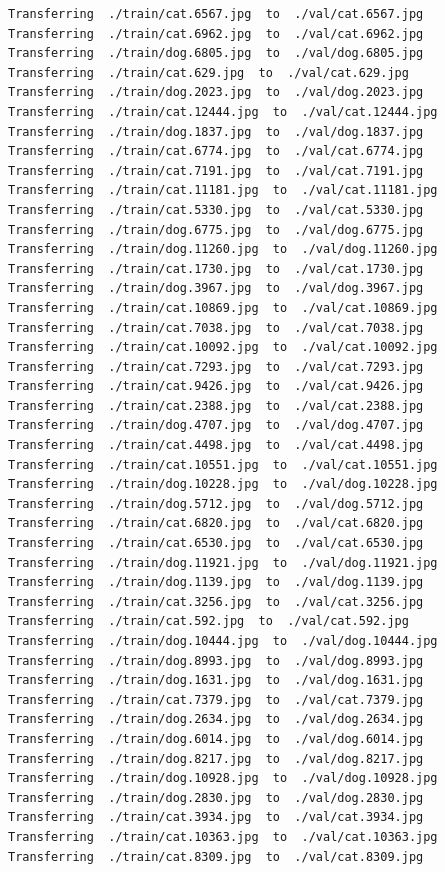 \documentclass[]{book}
\theoremstyle{definition}
\theoremstyle{definition}
\theoremstyle{definition}
\theoremstyle{remark}
\begin{document}
\begin{verbatim}
Transferring  ./train/cat.6567.jpg  to  ./val/cat.6567.jpg
Transferring  ./train/cat.6962.jpg  to  ./val/cat.6962.jpg
Transferring  ./train/dog.6805.jpg  to  ./val/dog.6805.jpg
Transferring  ./train/cat.629.jpg  to  ./val/cat.629.jpg
Transferring  ./train/dog.2023.jpg  to  ./val/dog.2023.jpg
Transferring  ./train/cat.12444.jpg  to  ./val/cat.12444.jpg
Transferring  ./train/dog.1837.jpg  to  ./val/dog.1837.jpg
Transferring  ./train/cat.6774.jpg  to  ./val/cat.6774.jpg
Transferring  ./train/cat.7191.jpg  to  ./val/cat.7191.jpg
Transferring  ./train/cat.11181.jpg  to  ./val/cat.11181.jpg
Transferring  ./train/cat.5330.jpg  to  ./val/cat.5330.jpg
Transferring  ./train/dog.6775.jpg  to  ./val/dog.6775.jpg
Transferring  ./train/dog.11260.jpg  to  ./val/dog.11260.jpg
Transferring  ./train/cat.1730.jpg  to  ./val/cat.1730.jpg
Transferring  ./train/dog.3967.jpg  to  ./val/dog.3967.jpg
Transferring  ./train/cat.10869.jpg  to  ./val/cat.10869.jpg
Transferring  ./train/cat.7038.jpg  to  ./val/cat.7038.jpg
Transferring  ./train/cat.10092.jpg  to  ./val/cat.10092.jpg
Transferring  ./train/cat.7293.jpg  to  ./val/cat.7293.jpg
Transferring  ./train/cat.9426.jpg  to  ./val/cat.9426.jpg
Transferring  ./train/cat.2388.jpg  to  ./val/cat.2388.jpg
Transferring  ./train/dog.4707.jpg  to  ./val/dog.4707.jpg
Transferring  ./train/cat.4498.jpg  to  ./val/cat.4498.jpg
Transferring  ./train/cat.10551.jpg  to  ./val/cat.10551.jpg
Transferring  ./train/dog.10228.jpg  to  ./val/dog.10228.jpg
Transferring  ./train/dog.5712.jpg  to  ./val/dog.5712.jpg
Transferring  ./train/cat.6820.jpg  to  ./val/cat.6820.jpg
Transferring  ./train/cat.6530.jpg  to  ./val/cat.6530.jpg
Transferring  ./train/dog.11921.jpg  to  ./val/dog.11921.jpg
Transferring  ./train/dog.1139.jpg  to  ./val/dog.1139.jpg
Transferring  ./train/cat.3256.jpg  to  ./val/cat.3256.jpg
Transferring  ./train/cat.592.jpg  to  ./val/cat.592.jpg
Transferring  ./train/dog.10444.jpg  to  ./val/dog.10444.jpg
Transferring  ./train/dog.8993.jpg  to  ./val/dog.8993.jpg
Transferring  ./train/dog.1631.jpg  to  ./val/dog.1631.jpg
Transferring  ./train/cat.7379.jpg  to  ./val/cat.7379.jpg
Transferring  ./train/dog.2634.jpg  to  ./val/dog.2634.jpg
Transferring  ./train/dog.6014.jpg  to  ./val/dog.6014.jpg
Transferring  ./train/dog.8217.jpg  to  ./val/dog.8217.jpg
Transferring  ./train/dog.10928.jpg  to  ./val/dog.10928.jpg
Transferring  ./train/dog.2830.jpg  to  ./val/dog.2830.jpg
Transferring  ./train/cat.3934.jpg  to  ./val/cat.3934.jpg
Transferring  ./train/cat.10363.jpg  to  ./val/cat.10363.jpg
Transferring  ./train/cat.8309.jpg  to  ./val/cat.8309.jpg

\end{verbatim}
\end{document}
